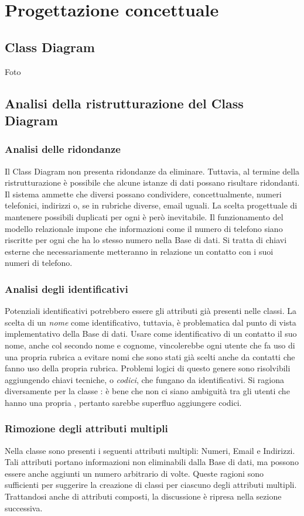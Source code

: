 \chapter{Progettazione concettuale}
\section{Class Diagram}
{\Huge Foto}
        
\section{Analisi della ristrutturazione del Class Diagram}

       
\subsection{Analisi delle ridondanze}
Il Class Diagram non presenta ridondanze da eliminare. Tuttavia, al termine della ristrutturazione è possibile che alcune istanze di dati possano risultare ridondanti. Il sistema ammette che \contatti diversi possano condividere, concettualmente, numeri telefonici, indirizzi o, se in rubriche diverse, email uguali. La scelta progettuale di mantenere possibili duplicati per ogni \contatto è però inevitabile. Il funzionamento del modello relazionale impone che informazioni come il numero di telefono siano riscritte per ogni \contatto che ha lo stesso numero nella Base di dati. Si tratta di chiavi esterne che necessariamente metteranno in relazione un contatto con i suoi numeri di telefono. 
\subsection{Analisi degli identificativi}
Potenziali identificativi potrebbero essere gli attributi già presenti nelle classi. La scelta di un \emph{nome} come identificativo, tuttavia, è problematica dal punto di vista implementativo della Base di dati. Usare come identificativo di un contatto il suo nome, anche col secondo nome e cognome, vincolerebbe ogni utente che fa uso di una propria rubrica a evitare nomi che sono stati già scelti anche da contatti che fanno uso della propria rubrica. Problemi logici di questo genere sono risolvibili aggiungendo chiavi tecniche, o \emph{codici}, che fungano da identificativi. Si ragiona diversamente per la classe \Rubrica: è bene che non ci siano ambiguità tra gli utenti che hanno una propria \rubrica, pertanto sarebbe superfluo aggiungere codici. 
\subsection{Rimozione degli attributi multipli}
Nella classe \Contatto sono presenti i seguenti attributi multipli: Numeri, Email e Indirizzi. Tali attributi portano informazioni non eliminabili dalla Base di dati, ma possono essere anche aggiunti un numero arbitrario di volte. Queste ragioni sono sufficienti per suggerire la creazione di classi per ciascuno degli attributi multipli. Trattandosi anche di attributi composti, la discussione è ripresa nella sezione successiva. 
